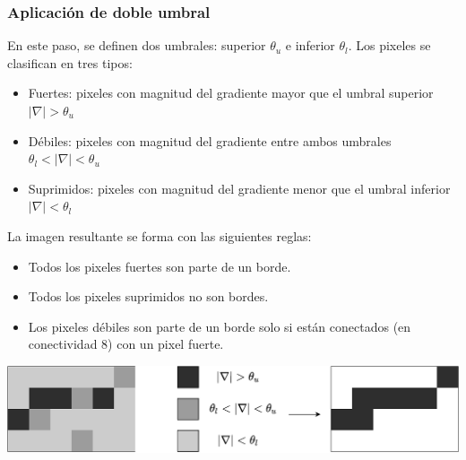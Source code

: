 \begin{frame}\frametitle{Aplicación de doble umbral}
  En este paso, se definen dos umbrales: superior $\theta_u$ e inferior $\theta_l$. Los pixeles se clasifican en tres tipos:
  \begin{itemize}
  \item Fuertes: pixeles con magnitud del gradiente mayor que el umbral superior $|\nabla | > \theta_u$
  \item Débiles: pixeles con magnitud del gradiente entre ambos umbrales $\theta_l < |\nabla| < \theta_u$
  \item Suprimidos: pixeles con magnitud del gradiente menor que el umbral inferior $|\nabla| < \theta_l$
  \end{itemize}
  La imagen resultante se forma con las siguientes reglas:
  \begin{itemize}
  \item Todos los pixeles fuertes son parte de un borde.
  \item Todos los pixeles suprimidos no son bordes. 
  \item Los pixeles débiles son parte de un borde solo si están conectados (en conectividad 8) con un pixel fuerte.
  \end{itemize}
  \includegraphics[width=\textwidth]{Figuras/DoubleThreshold.pdf}
\end{frame}


